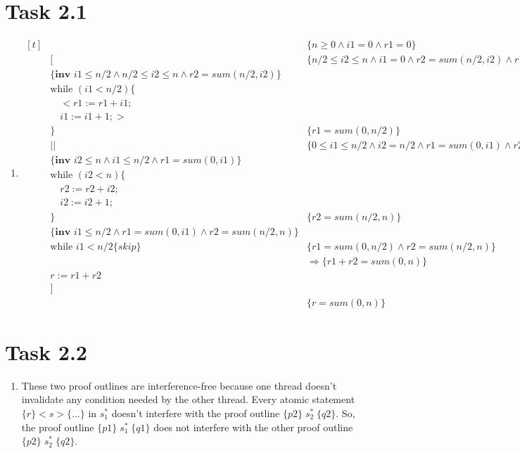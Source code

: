 \documentclass{article}
\newcommand{\answer}{\item[]} %
\begin{document}
	\section{Task 2.1}
		\begin{enumerate}[label = {(\alph*)}]
			
			\answer
			$\begin{aligned}[t]
				&\qquad \qquad \qquad \qquad &\{n \geq 0 \land i1 = 0 \land r1 = 0\} \\
				&[ &\{n / 2 \leq i2 \leq n \land i1 = 0 \land r2 = sum(n / 2, i2) \land r1 = 0\}\\
				&\{\textbf{inv } i1 \leq n / 2 \land n / 2 \leq i2 \leq n \land r2 = sum(n / 2, i2)\} \\
				&\text{while }(i1 < n / 2) \{ \\
				&\quad < r1 := r1 + i1; \\
				&\quad i1 := i1 + 1; > \\
				&\} &\{r1 = sum(0, n / 2)\} \\
				&|| &\{0 \leq i1 \leq n / 2 \land i2 = n / 2 \land r1 = sum(0, i1) \land r2 = 0\} \\
				&\{\textbf{inv } i2 \leq n \land i1 \leq n / 2 \land r1 = sum(0, i1)\} \\
				&\text{while }(i2 < n) \{ \\
				&\quad r2 := r2 + i2; \\
				&\quad i2 := i2 + 1; \\
				&\} &\{r2 = sum(n / 2, n)\} \\
				&\{\textbf{inv } i1 \leq n / 2 \land r1 = sum(0, i1) \land r2 = sum(n / 2, n)\} \\
				&\text{while } i1 < n / 2 \{skip\} &\{r1 = sum(0, n / 2) \land r2 = sum(n / 2, n)\} \\
				& &\Rightarrow \{r1 + r2 = sum(0, n)\} \\
				&r := r1 + r2 \\
				&] \\
				& &\{r = sum(0, n)\}
 			\end{aligned}$
			
		\end{enumerate}
	
	\pagebreak
	
	\section{Task 2.2}
		\begin{enumerate}[label = {(\alph*)}]
			
			\answer These two proof outlines are interference-free because one thread doesn't invalidate any condition needed by the other thread. Every atomic statement $\{r\} <s> \{...\}$ in $s_{1}^{*}$ doesn't interfere with the proof outline $\{p2\}\; s_{2}^{*} \;\{q2\}$. So, the proof outline $\{p1\}\; s_{1}^{*} \;\{q1\}$ does not interfere with the other proof outline $\{p2\}\; s_{2}^{*} \;\{q2\}$.
			
		\end{enumerate}
	
\end{document}
